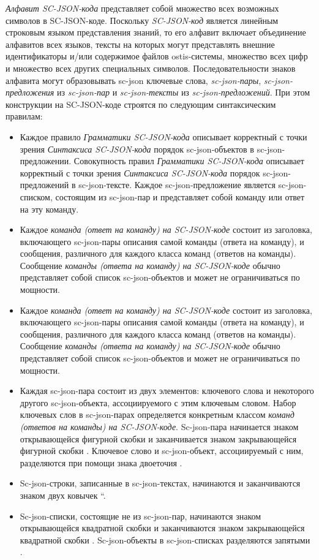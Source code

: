 \textit{Алфавит SC-JSON-кода\scnsupergroupsign} представляет собой множество всех возможных символов в SC-JSON-коде.
Поскольку \textit{SC-JSON-код} является линейным строковым языком представления знаний, то его алфавит включает
объединение алфавитов всех языков, тексты на которых могут представлять внешние идентификаторы и/или содержимое файлов ostis-системы,
множество всех цифр и множество всех других специальных символов. Последовательности знаков алфавита могут образовывать
sc-json ключевые слова, \textit{sc-json-пары}, \textit{sc-json-предложения} из \textit{sc-json-пар} и
\textit{sc-json-тексты} из \textit{sc-json-предложений}. При этом конструкции на SC-JSON-коде строятся по следующим
синтаксическим правилам:
\begin{itemize}
    \item Каждое правило \textit{Грамматики SC-JSON-кода} описывает корректный с точки зрения \textit{Синтаксиса
    SC-JSON-кода} порядок sc-json-объектов в sc-json-предложении. Совокупность правил \textit{Грамматики SC-JSON-кода}
    описывает корректный с точки зрения \textit{Синтаксиса SC-JSON-кода} порядок sc-json-предложений в sc-json-тексте.
    Каждое sc-json-предложение является sc-json-списком, состоящим из sc-json-пар и представляет собой команду или ответ
    на эту команду.
    \item Каждое \textit{команда (ответ на команду) на SC-JSON-коде} состоит из заголовка, включающего sc-json-пары
    описания самой команды (ответа на команду), и сообщения, различного для каждого класса команд (ответов на команды).
    Сообщение \textit{команды (ответа на команду) на SC-JSON-коде} обычно представляет собой список sc-json-объектов и
    может не ограничиваться по мощности.
    \item Каждое \textit{команда (ответ на команду) на SC-JSON-коде} состоит из заголовка, включающего sc-json-пары
    описания самой команды (ответа на команду), и сообщения, различного для каждого класса команд (ответов на команды).
    Сообщение \textit{команды (ответа на команду) на SC-JSON-коде} обычно представляет собой список sc-json-объектов и
    может не ограничиваться по мощности.
    \item Каждая sc-json-пара состоит из двух элементов: ключевого слова и некоторого другого sc-json-объекта,
    ассоциируемого с этим ключевым словом. Набор ключевых слов в sc-json-парах определяется конкретным классом
    \textit{команд (ответов на команды) на SC-JSON-коде}. Sc-json-пара начинается знаком открывающейся фигурной скобки
    \scnqq{\{} и заканчивается знаком закрывающейся фигурной скобки \scnqq{\}}. Ключевое слово и sc-json-объект,
    ассоциируемый с ним, разделяются при помощи знака двоеточия \scnqq{:}.
    \item Sc-json-строки, записанные в sc-json-текстах, начинаются и заканчиваются знаком двух ковычек \textquotedblleft.
    \item Sc-json-списки, состоящие не из sc-json-пар, начинаются знаком открывающейся квадратной скобки \scnqq{[} и
    заканчиваются знаком закрывающейся квадратной скобки \scnqq{]}. Sc-json-объекты в sc-json-списках разделяются
    запятыми \scnqq{,}.
\end{itemize}

